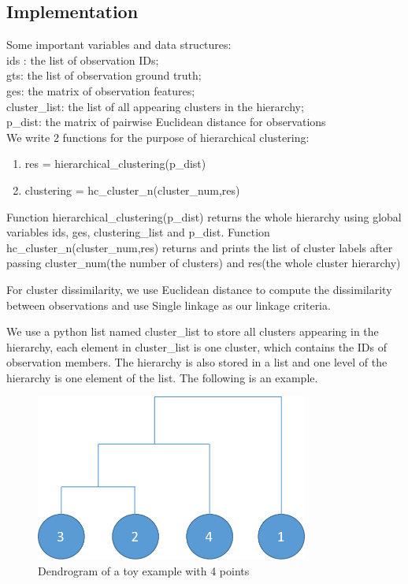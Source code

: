 \documentclass[paper=letter, fontsize=11pt]{article}
\numberwithin{equation}{section}		%
\numberwithin{figure}{section}			%
\numberwithin{table}{section}				%
\begin{document}
\subsection{Implementation}
Some important variables and data structures:\\
ids : the list of observation IDs;\\
gts: the list of observation ground truth;\\
ges: the matrix of observation features;\\
cluster\_list: the list of all appearing clusters in the hierarchy;\\
p\_dist: the matrix of pairwise Euclidean distance for observations\\


We write 2 functions for the purpose of hierarchical clustering: 
\begin{enumerate}
	\item res = hierarchical\_clustering(p\_dist)
	\item clustering = hc\_cluster\_n(cluster\_num,res)
\end{enumerate}

Function hierarchical\_clustering(p\_dist) returns the whole hierarchy using global variables ids, ges, clustering\_list and p\_dist.
Function hc\_cluster\_n(cluster\_num,res) returns and prints the list of cluster labels after passing cluster\_num(the number of clusters) and res(the whole cluster hierarchy)


For cluster dissimilarity, we use Euclidean distance to compute the dissimilarity between observations and use Single linkage as our linkage criteria. 

We use a python list named  cluster\_list to store all clusters appearing in the hierarchy, each element in cluster\_list is one cluster, which contains the IDs of observation members. The hierarchy is also stored in a list and one level of the hierarchy is one element of the list. The following is an example.

\begin{figure}[H]
	\centering
	\includegraphics[width=0.8\textwidth]{example_den.pdf}
	\caption{Dendrogram of a toy example with 4 points}
\end{figure}
\end{document}
